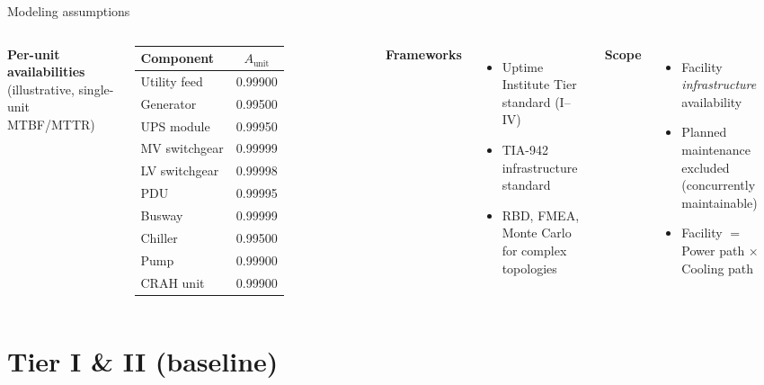 \documentclass[aspectratio=169,10pt]{beamer}
\begin{document}
\begin{frame}{Modeling assumptions}
  \begin{columns}[T]
      \textbf{Per-unit availabilities} (illustrative, single-unit MTBF/MTTR)
      \vspace{0.3em}
      \footnotesize
      \renewcommand{\arraystretch}{1.15}
      \begin{tabular}{lc}
        \toprule
        Component & $A_{\text{unit}}$ \\
        \midrule
        Utility feed      & 0.99900 \\
        Generator         & 0.99500 \\
        UPS module        & 0.99950 \\
        MV switchgear     & 0.99999 \\
        LV switchgear     & 0.99998 \\
        PDU               & 0.99995 \\
        Busway            & 0.99999 \\
        Chiller           & 0.99500 \\
        Pump              & 0.99900 \\
        CRAH unit         & 0.99900 \\
        \bottomrule
      \end{tabular}
      \textbf{Frameworks}
      \begin{itemize}
        \item Uptime Institute Tier standard (I--IV)
        \item TIA-942 infrastructure standard
        \item RBD, FMEA, Monte Carlo for complex topologies
      \end{itemize}
      \vspace{0.6em}
      \textbf{Scope}
      \begin{itemize}
        \item Facility \emph{infrastructure} availability
        \item Planned maintenance excluded (concurrently maintainable)
        \item Facility $=$ Power path $\times$ Cooling path
      \end{itemize}
  \end{columns}
\end{frame}

\section{Tier I \& II (baseline)}
\end{document}
